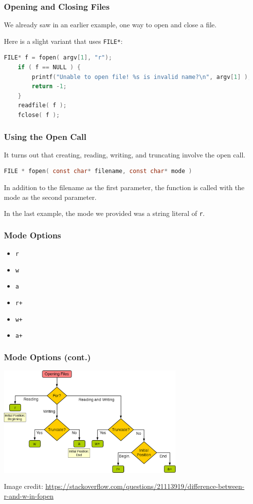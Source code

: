 \begin{frame}[fragile]
	\frametitle{Opening and Closing Files}
	We already saw in an earlier example, one way to open and close a file.
	
	Here is a slight variant that uses \texttt{FILE*}:
	
	\begin{lstlisting}[language=C]
    FILE* f = fopen( argv[1], "r");
    if ( f == NULL ) {
        printf("Unable to open file! %s is invalid name?\n", argv[1] );
        return -1;
    }
    readfile( f );
    fclose( f );
\end{lstlisting}
\end{frame}



\begin{frame}[fragile]
	\frametitle{Using the Open Call}

	It turns out that creating, reading, writing, and truncating involve the open call.

	\begin{lstlisting}[language=C]
FILE * fopen( const char* filename, const char* mode )
\end{lstlisting}

	In addition to the filename as the first parameter, the function is called with the mode as the second parameter.

	In the last example, the mode we provided was a string literal of \texttt{r}.

\end{frame}


\begin{frame}
	\frametitle{Mode Options}

	\begin{itemize}
		\item \texttt{r}
		\item \texttt{w}
		\item \texttt{a}
		\item \texttt{r+}
		\item \texttt{w+}
		\item \texttt{a+}
	\end{itemize}

\end{frame}

\begin{frame}
	\frametitle{Mode Options (cont.)}
	\begin{center}
		\includegraphics[width=0.7\textwidth]{images/AJW8x}
	\end{center}
	{\tiny Image credit: \url{https://stackoverflow.com/questions/21113919/difference-between-r-and-w-in-fopen}}
\end{frame}


